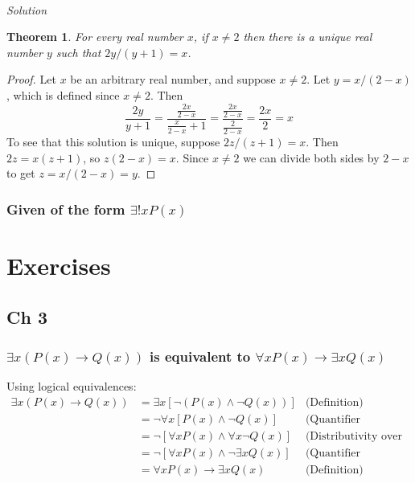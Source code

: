 \documentclass{report}
\newtheorem*{theorem}{Theorem}
\theoremstyle{definition}
\begin{document}
\vspace{1mm}\\
\textit{Solution}
\begin{theorem}
For every real number $x$, if $x\neq2$ then there is a unique real number $y$ such that $2y/(y+1)=x$.
\end{theorem}
\begin{proof}
Let $x$ be an arbitrary real number, and suppose $x\neq 2$. Let $y=x/(2-x)$, which is defined since $x\neq2$. Then
\begin{equation*}
\frac{2y}{y+1}=\frac{\frac{2x}{2-x}}{\frac{x}{2-x}+1}=\frac{\frac{2x}{2-x}}{\frac{2}{2-x}}=\frac{2x}{2}=x
\end{equation*}
To see that this solution is unique, suppose $2z/(z+1)=x$. Then $2z=x(z+1)$, so $z(2-x)=x$. Since $x\neq2$ we can divide both sides by $2-x$ to get $z=x/(2-x)=y$.
\end{proof}
\newpage

\subsection{Given of the form $\exists!xP(x)$}










\appendix
\chapter{Exercises}
\section{Ch 3}
\subsection{$\exists x(P(x)\to Q(x))$ is equivalent to $\forall xP(x)\to\exists xQ(x)$}
Using logical equivalences:
\begin{align*}
\exists x(P(x)\to Q(x))&=\exists x[\neg(P(x)\land\neg Q(x))]&\text{(Definition)}\\
&=\neg\forall x[P(x)\land\neg Q(x)]&\text{(Quantifier negation)}\\
&=\neg[\forall xP(x)\land\forall x\neg Q(x)]&\text{(Distributivity over conjuction)}\\
&=\neg[\forall xP(x)\land\neg\exists xQ(x)]&\text{(Quantifier negation)}\\
&=\forall xP(x)\to\exists xQ(x)&\text{(Definition)}
\end{align*}
\end{document}
